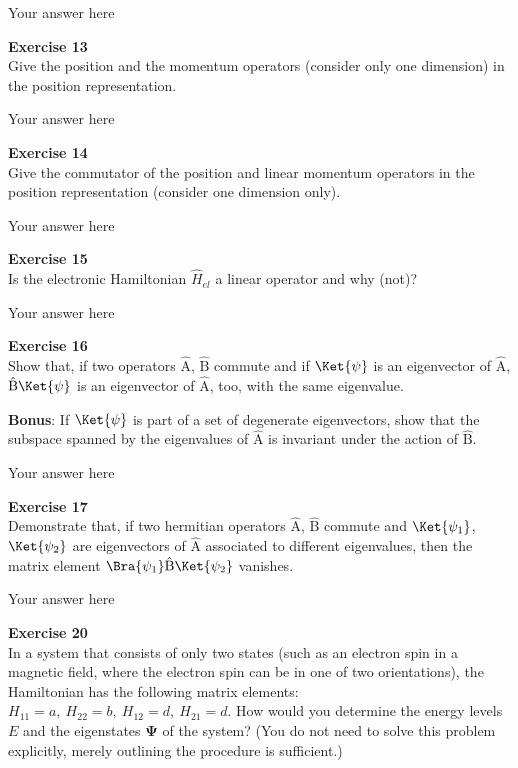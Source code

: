 \documentclass{article}
\begin{document}
Your answer here

\begin{mdframed}
\textbf{Exercise 13}\\
Give the position and the momentum operators (consider only one
dimension) in the position representation.
\end{mdframed}

Your answer here

\begin{mdframed}
\textbf{Exercise 14}\\
Give the commutator of the position and linear momentum operators in
the position representation (consider one dimension only).
\end{mdframed}

Your answer here

\begin{mdframed}
\textbf{Exercise 15}\\
Is the electronic Hamiltonian $\hat{H}_{el}$ a linear operator and
why (not)?
\end{mdframed}

Your answer here

\begin{mdframed}
\textbf{Exercise 16}\\
Show that, if two operators $\hat{\mathrm{A}}$, $\hat{\mathrm{B}}$
commute and if $\Ket{\psi}$ is an eigenvector of $\hat{\mathrm{A}}$,
$\hat{\mathrm{B}}\Ket{\psi}$ is an eigenvector of
$\hat{\mathrm{A}}$, too, with the same eigenvalue.

\textbf{Bonus}:  If $\Ket{\psi}$ is part of a set of degenerate
eigenvectors, show that the subspace spanned by the eigenvalues of
$\hat{\mathrm{A}}$ is invariant under the action of
$\hat{\mathrm{B}}$.
\end{mdframed}

Your answer here

\begin{mdframed}
\textbf{Exercise 17}\\
Demonstrate that, if two hermitian operators $\hat{\mathrm{A}}$,
$\hat{\mathrm{B}}$ commute and ${\Ket{\psi_1}}$, ${\Ket{\psi_2}}$
are eigenvectors of $\hat{\mathrm{A}}$ associated to different
eigenvalues, then the matrix element
$\Bra{\psi_1}\hat{\mathrm{B}}\Ket{\psi_2}$ vanishes.
\end{mdframed}

Your answer here

\begin{mdframed}
\textbf{Exercise 20}\\
In a system that consists of only two states (such as an electron spin
in a magnetic field, where the electron spin can be in one of two
orientations), the Hamiltonian has the following matrix elements:
$H_{11}=a, \ H_{22}=b, \ H_{12}=d, \ H_{21}=d$. How would you determine
the energy levels $E$ and the eigenstates $\mathbf{\Psi}$ of the system?
(You do not need to solve this problem explicitly, merely outlining the
procedure is sufficient.)
\end{mdframed}
\end{document}
